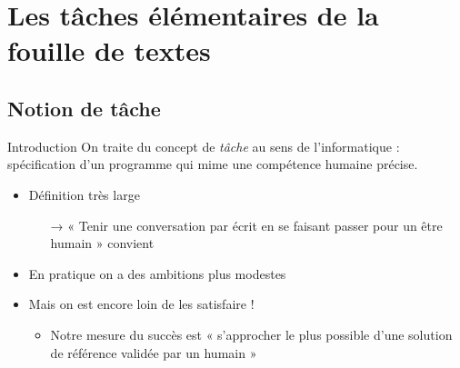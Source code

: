 \documentclass[hyperref={unicode}, xcolor={svgnames}, french]{beamer}
\begin{document}

\section{Les tâches élémentaires de la fouille de textes}

\subsection{Notion de tâche}

\begin{frame}{Introduction}
    On traite du concept de \textit{tâche} au sens de l'informatique : spécification d'un programme qui mime une compétence humaine précise.

    \begin{itemize}
        \item Définition très large
            \begin{itemize}
                \item[→] « Tenir une conversation par écrit en se faisant passer pour un être humain » convient
            \end{itemize}
        \item En pratique on a des ambitions plus modestes
        \item Mais on est encore loin de les satisfaire !
         \begin{itemize}
             \item Notre mesure du succès est « s'approcher le plus possible d'une solution de référence validée par un humain »
         \end{itemize}
    \end{itemize}
 \end{frame}
\end{document}

